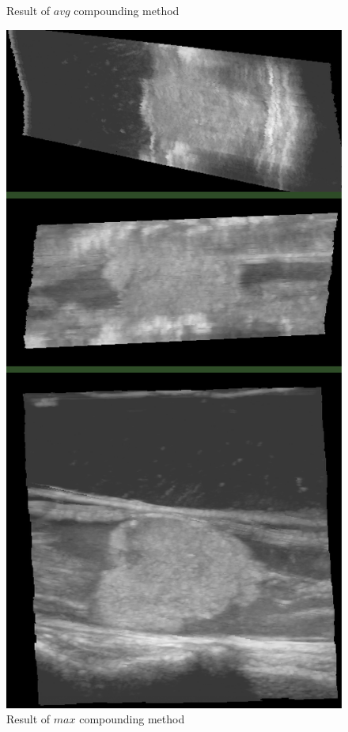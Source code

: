 \begin{figure}
\begin{minipage}[b]{0.326\textwidth}
	\caption{Result of $avg$ compounding method}
	\label{fig:large_avg}
\end{minipage}
\hspace{0.01\textwidth}
\begin{minipage}[b]{0.326\textwidth}
	\centering
	\includegraphics[width=\textwidth]{graphics/large_max.png}
	\caption{Result of $max$ compounding method}
	\label{fig:large_max}
\end{minipage}
\end{figure}

